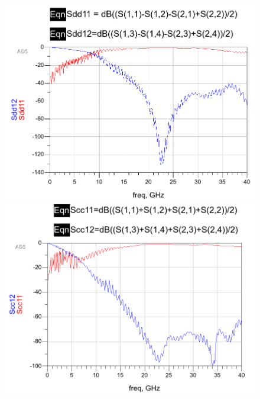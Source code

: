 \documentclass{book}  %
\begin{document}
\begin{paper}
\begin{figure}[htbp!]
	\centering	
	\begin{minipage}[b]{0.5\linewidth}
		\includegraphics[width=\textwidth]{./img/S-parameter/differential.png}
	\end{minipage}%
	\begin{minipage}[b]{0.5\linewidth}
		\includegraphics[width=\textwidth]{./img/S-parameter/common.png}
	\end{minipage}
	\begin{minipage}[b]{0.5\linewidth}

\end{minipage}
\end{figure}
\end{paper}
\end{document}

